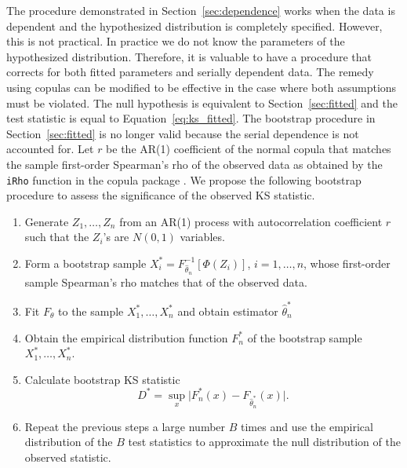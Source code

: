 \documentclass[12pt, letterpaper, titlepage]{article}
\begin{document}
The procedure demonstrated in Section~\ref{sec:dependence} works when the data 
is dependent and the hypothesized distribution is completely specified. However,
this is not practical. In practice we do not know the parameters of the 
hypothesized distribution. Therefore, it is valuable to have a procedure that
corrects for both fitted parameters and serially dependent data. The remedy 
using copulas can be modified to be effective in the case where both assumptions
must be violated. The null hypothesis is equivalent to Section~\ref{sec:fitted} 
and the test statistic is equal to Equation~\eqref{eq:ks_fitted}. The bootstrap
procedure in Section~\ref{sec:fitted} is no longer valid because the serial
dependence is not accounted for. Let $r$ be the AR(1) coefficient of the normal 
copula that matches the sample first-order Spearman's rho of the observed data 
as obtained by the \texttt{iRho} function in the \textsf{copula} package 
\citep{Copula}. We propose the following bootstrap procedure to assess the 
significance of the observed KS statistic.

\begin{enumerate}
\item
  Generate $Z_1, \ldots, Z_n$ from an AR(1) process with autocorrelation
  coefficient $r$ such that the $Z_i$'s are $N(0, 1)$ variables.
\item
  Form a bootstrap sample $X_i^* = F^{-1}_{\hat\theta_n} [\Phi(Z_i)]$,
  $i = 1, \ldots, n$, whose first-order sample Spearman's rho matches that of
  the observed data.
\item
  Fit $F_\theta$ to the sample $X_1^*, \ldots, X_n^*$ and obtain estimator 
  $\hat\theta_n^*$
\item
  Obtain the empirical distribution function $F_n^*$ of the bootstrap sample
  $X_1^*, \ldots, X_n^*$.
\item 
  Calculate bootstrap KS statistic
  \[
    D^* = \sup_x \lvert F_n^* (x)- F_{\hat\theta_n^*}(x) \rvert.
  \]
\item
  Repeat the previous steps a large number $B$ times and use the empirical
    distribution of the $B$ test statistics to approximate
    the null distribution of the observed statistic.      
\end{enumerate}
\end{document}
